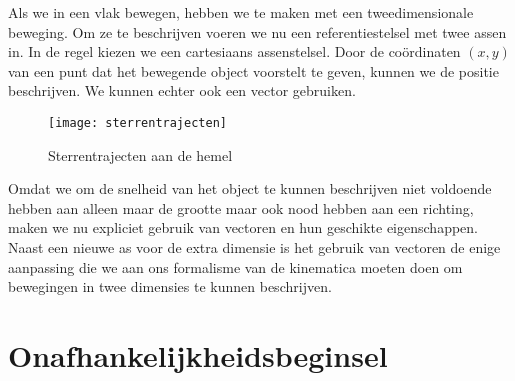 \documentclass{ximera}
\begin{document}
	\author{Bart Lambregs}
    \xmsource


	Als we in een vlak bewegen, hebben we te maken met een tweedimensionale beweging. 
	Om ze te beschrijven voeren we nu een referentiestelsel met twee assen in. In de regel kiezen we een cartesiaans assenstelsel.  Door de co\"ordinaten $(x,y)$ van een punt dat het bewegende object voorstelt te geven, kunnen we de positie beschrijven. We kunnen echter ook een vector gebruiken.
	\begin{figure}[h]
	\centering
	\texttt{[image: sterrentrajecten]}
	\caption{Sterrentrajecten aan de hemel}
	\end{figure}
	Omdat we om de snelheid van het object te kunnen beschrijven niet voldoende hebben aan alleen maar de grootte maar ook nood hebben aan een richting, maken we nu expliciet gebruik van vectoren en hun geschikte eigenschappen. Naast een nieuwe as voor de extra dimensie is het gebruik van vectoren de enige aanpassing die we aan ons formalisme van de kinematica moeten doen om bewegingen in twee dimensies te kunnen beschrijven.
	

	\section{Onafhankelijkheidsbeginsel}
	
\end{document}
